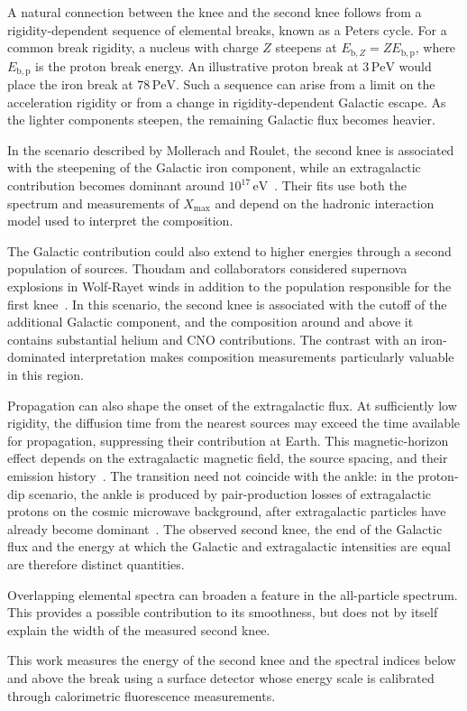\documentclass[main.tex]{subfiles}
\begin{document}
A natural connection between the knee and the second knee follows from a rigidity-dependent sequence of elemental breaks, known as a Peters cycle.
For a common break rigidity, a nucleus with charge $Z$ steepens at $E_{\mathrm{b},Z}=Z E_{\mathrm{b,p}}$, where $E_{\mathrm{b,p}}$ is the proton break energy.
An illustrative proton break at $3\,\mathrm{PeV}$ would place the iron break at $78\,\mathrm{PeV}$.
Such a sequence can arise from a limit on the acceleration rigidity or from a change in rigidity-dependent Galactic escape.
As the lighter components steepen, the remaining Galactic flux becomes heavier.

In the scenario described by Mollerach and Roulet, the second knee is associated with the steepening of the Galactic iron component, while an extragalactic contribution becomes dominant around $10^{17}\,\mathrm{eV}$~\cite{Mollerach:2019:GalacticScenario}.
Their fits use both the spectrum and measurements of $X_{\max}$ and depend on the hadronic interaction model used to interpret the composition.

The Galactic contribution could also extend to higher energies through a second population of sources.
Thoudam and collaborators considered supernova explosions in Wolf-Rayet winds in addition to the population responsible for the first knee~\cite{Thoudam:2016:SecondGalacticComponent}.
In this scenario, the second knee is associated with the cutoff of the additional Galactic component, and the composition around and above it contains substantial helium and CNO contributions.
The contrast with an iron-dominated interpretation makes composition measurements particularly valuable in this region.

Propagation can also shape the onset of the extragalactic flux.
At sufficiently low rigidity, the diffusion time from the nearest sources may exceed the time available for propagation, suppressing their contribution at Earth.
This magnetic-horizon effect depends on the extragalactic magnetic field, the source spacing, and their emission history~\cite{Lemoine:2005:MagneticHorizon}.
The transition need not coincide with the ankle: in the proton-dip scenario, the ankle is produced by pair-production losses of extragalactic protons on the cosmic microwave background, after extragalactic particles have already become dominant~\cite{Aloisio:2012:Transition}.
The observed second knee, the end of the Galactic flux and the energy at which the Galactic and extragalactic intensities are equal are therefore distinct quantities.

Overlapping elemental spectra can broaden a feature in the all-particle spectrum.
This provides a possible contribution to its smoothness, but does not by itself explain the width of the measured second knee.

This work measures the energy of the second knee and the spectral indices below and above the break using a surface detector whose energy scale is calibrated through calorimetric fluorescence measurements.
\end{document}
